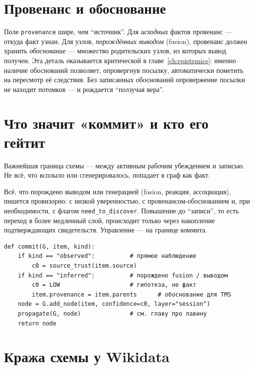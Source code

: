 \section{Провенанс и обоснование}
\label{sec:prov}

Поле \texttt{provenance} шире, чем ``источник''. Для \emph{исходных} фактов
провенанс --- откуда факт узнан. Для узлов, \emph{порождённых выводом}
(fusion), провенанс должен хранить \emph{обоснование} --- множество
родительских узлов, из которых вывод получен. Эта деталь оказывается
критической в главе~\ref{ch:epistemics}: именно наличие обоснований позволяет,
опровергнув посылку, автоматически пометить на пересмотр её следствия. Без
записанных обоснований опровержение посылки не находит потомков --- и
рождается ``ползучая вера''.

\section{Что значит «коммит» и кто его гейтит}

Важнейшая граница схемы --- между активным рабочим убеждением и записью. Не
всё, что всплыло или сгенерировалось, попадает в граф как факт.

\begin{principle}
Всё, что порождено выводом или генерацией (fusion, реакция, ассоциация),
пишется провизорно: с низкой уверенностью, с провенансом-обоснованием и, при
необходимости, с флагом \texttt{need\_to\_discover}. Повышение до ``записи'',
то есть переход в более медленный слой, происходит только через накопление
подтверждающих свидетельств. Управление --- на границе коммита.
\end{principle}

\begin{lstlisting}[style=pseudo]
def commit(G, item, kind):
    if kind == "observed":          # прямое наблюдение
        c0 = source_trust(item.source)
    if kind == "inferred":          # порождено fusion / выводом
        c0 = LOW                    # гипотеза, не факт
        item.provenance = item.parents      # обоснование для TMS
    node = G.add_node(item, confidence=c0, layer="session")
    propagate(G, node)              # см. главу про лавину
    return node
\end{lstlisting}

\section{Кража схемы у Wikidata}

